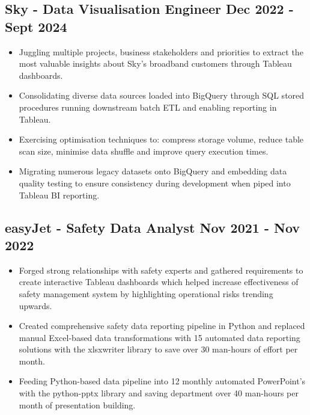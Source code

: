 \documentclass[a4paper,9pt]{article}
\begin{document}
\subsection*{\textbf{Sky - Data Visualisation Engineer} \hfill  Dec 2022 - Sept 2024}
\begin{itemize}[noitemsep]
    \item Juggling multiple projects, business stakeholders and priorities to extract the most valuable insights about Sky's broadband customers through Tableau dashboards.
    \item Consolidating diverse data sources loaded into BigQuery through SQL stored procedures running downstream batch ETL and enabling reporting in Tableau.
    \item Exercising optimisation techniques to: compress storage volume, reduce table scan size, minimise data shuffle and improve query execution times.
    \item Migrating numerous legacy datasets onto BigQuery and embedding data quality testing to ensure consistency during development when piped into Tableau BI reporting.
\end{itemize}

\subsection*{\textbf{easyJet - Safety Data Analyst} \hfill  Nov 2021 - Nov 2022}
\begin{itemize}[noitemsep]
    \item Forged strong relationships with safety experts and gathered requirements to create interactive Tableau dashboards which helped increase effectiveness of safety management system by highlighting operational risks trending upwards.
    \item Created comprehensive safety data reporting pipeline in Python and replaced manual Excel-based data transformations with 15 automated data reporting solutions with the xlsxwriter library to save over 30 man-hours of effort per month.
    \item Feeding Python-based data pipeline into 12 monthly automated PowerPoint's with the python-pptx library and saving department over 40 man-hours per month of presentation building.
\end{itemize}
\end{document}
